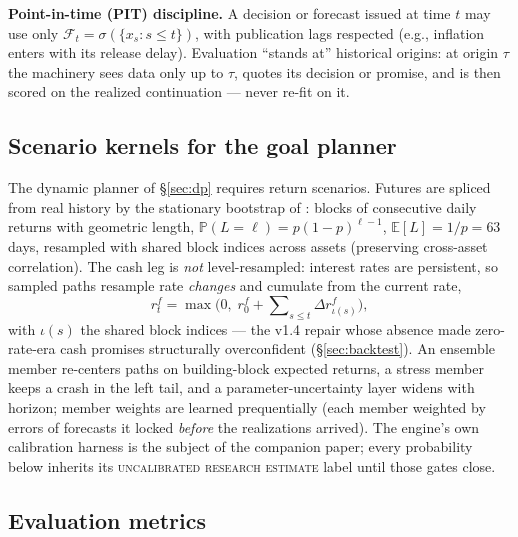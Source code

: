 \documentclass[11pt]{article}
\newcommand{\E}{\mathbb{E}}
\newcommand{\Prob}{\mathbb{P}}
\begin{document}
\textbf{Point-in-time (PIT) discipline.} A decision or forecast issued at time $t$ may use only
$\mathcal{F}_t = \sigma(\{x_s : s \le t\})$, with publication lags respected (e.g., inflation
enters with its release delay). Evaluation ``stands at'' historical origins: at origin $\tau$
the machinery sees data only up to $\tau$, quotes its decision or promise, and is then scored on
the realized continuation --- never re-fit on it.

\subsection{Scenario kernels for the goal planner}
\label{sec:kernels}

The dynamic planner of \S\ref{sec:dp} requires return scenarios. Futures are spliced from real
history by the stationary bootstrap of \citet{politis1994}: blocks of consecutive daily returns
with geometric length, $\Prob(L=\ell) = p(1-p)^{\ell-1}$, $\E[L] = 1/p = 63$ days, resampled
with shared block indices across assets (preserving cross-asset correlation). The cash leg is
\emph{not} level-resampled: interest rates are persistent, so sampled paths resample rate
\emph{changes} and cumulate from the current rate,
\begin{equation}
r^{f}_{t} = \max\!\Big(0,\; r^{f}_{0} + \sum\nolimits_{s\le t} \Delta r^{f}_{\iota(s)}\Big),
\label{eq:persistentrate}
\end{equation}
with $\iota(s)$ the shared block indices --- the v1.4 repair whose absence made zero-rate-era
cash promises structurally overconfident (\S\ref{sec:backtest}). An ensemble member re-centers
paths on building-block expected returns, a stress member keeps a crash in the left tail, and a
parameter-uncertainty layer widens with horizon; member weights are learned prequentially (each
member weighted by errors of forecasts it locked \emph{before} the realizations arrived). The
engine's own calibration harness is the subject of the companion paper; every probability below
inherits its \textsc{uncalibrated research estimate} label until those gates close.

\subsection{Evaluation metrics}
\label{sec:evalmetrics}
\end{document}
